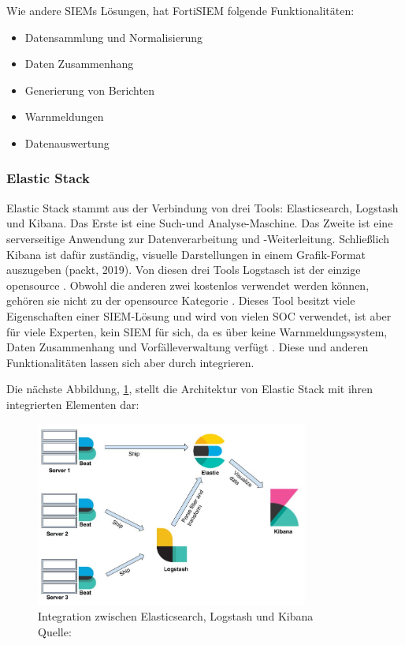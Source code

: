 Wie andere \glspl{SIEM} Lösungen, hat FortiSIEM folgende Funktionalitäten:

\begin{itemize}[noitemsep]
   \item Datensammlung und Normalisierung
   \item Daten Zusammenhang
   \item Generierung von Berichten
   \item Warnmeldungen
   \item Datenauswertung
\end{itemize}

\subsubsection{Elastic Stack}
Elastic Stack stammt aus der Verbindung von drei Tools: Elasticsearch, Logstash und Kibana. Das Erste ist eine Such-und Analyse-Maschine. Das Zweite ist eine serverseitige Anwendung zur Datenverarbeitung und -Weiterleitung. Schließlich Kibana \label{kibana} ist dafür zuständig, visuelle Darstellungen in einem Grafik-Format auszugeben (packt, 2019). Von diesen drei Tools Logstasch ist der einzige \gls{opensource} \citep{elastic_OSI}. Obwohl die anderen zwei 
kostenlos verwendet werden können, gehören sie nicht zu der \gls{opensource} Kategorie \citep{OpenSource_Def}. Dieses Tool besitzt viele Eigenschaften einer \gls{SIEM}-Lösung und wird von vielen SOC verwendet, ist aber für viele Experten, kein \gls{SIEM} für sich, da es über keine Warnmeldungssystem, Daten Zusammenhang und Vorfälleverwaltung verfügt \citep{Miller_ELK}. Diese und anderen Funktionalitäten lassen sich aber durch  integrieren. 

\newpage
Die nächste Abbildung, \ref{fig:Intregation_ELK}, stellt die Architektur von Elastic Stack mit ihren integrierten Elementen dar:

\begin{figure}[H]
   \centering
   \includegraphics[width=0.8\textwidth]{assets/2_p8.png}
   \caption[Integration zwischen Elasticsearch, Logstash und Kibana]
   {Integration zwischen Elasticsearch, Logstash und Kibana\\Quelle: \citep{packt_elkstack} }
   \label{fig:Intregation_ELK}
   \centering
\end{figure}

